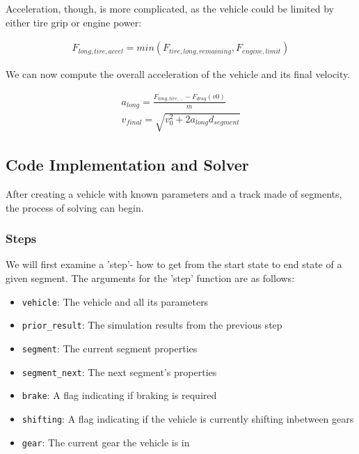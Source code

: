 \documentclass{article}
\begin{document}
Acceleration, though, is more complicated, as the vehicle could be limited by either tire grip or engine power:

\begin{align}
	F_{long,tire,accel} = min(F_{tire,long,remaining}, F_{engine,limit})
\end{align}

We can now compute the overall acceleration of the vehicle and its final velocity.

\begin{align}
	a_{long} = \frac{F_{long,tire,...} - F_{drag}(v0)}{m} \\
	v_{final} = \sqrt{v_0^2 + 2 a_{long} d_{segment}}
\end{align}


\subsection{Code Implementation and Solver}

After creating a vehicle with known parameters and a track made of segments, the process of solving can begin. 

\subsubsection{Steps}

We will first examine a 'step'- how to get from the start state to end state of a given segment. The arguments for the 'step' function are as follows:

\begin{itemize}
\item \texttt{vehicle}: The vehicle and all its parameters
\item \texttt{prior\_result}: The simulation results from the previous step
\item \texttt{segment}: The current segment properties
\item \texttt{segment\_next}: The next segment's properties
\item \texttt{brake}: A flag indicating if braking is required
\item \texttt{shifting}: A flag indicating if the vehicle is currently shifting inbetween gears
\item \texttt{gear}: The current gear the vehicle is in
\end{itemize}
\end{document}
